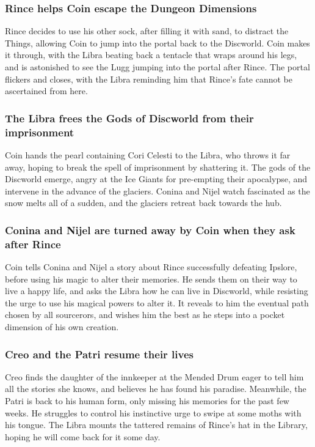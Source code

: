 \subsubsection{\Gls{Rince} helps \Gls{Coin} escape the Dungeon Dimensions}
\Gls{Rince} decides to use his other sock, after filling it with sand, to distract the Things,
allowing \Gls{Coin} to jump into the portal back to the Discworld. \Gls{Coin} makes it through,
with the \Gls{Libra} beating back a tentacle that wraps around his legs, and is astonished to see
the \Gls{Lugg} jumping into the portal after \Gls{Rince}. The portal flickers and closes, with the
\Gls{Libra} reminding him that \Gls{Rince}'s fate cannot be ascertained from here.

\subsubsection{The \Gls{Libra} frees the Gods of Discworld from their imprisonment}
\Gls{Coin} hands the pearl containing Cori Celesti to the \Gls{Libra}, who throws it far away,
hoping to break the spell of imprisonment by shattering it. The gods of the Discworld emerge, angry
at the Ice Giants for pre-empting their apocalypse, and intervene in the advance of the glaciers.
\Gls{Conina} and \Gls{Nijel} watch fascinated as the snow melts all of a sudden, and the glaciers
retreat back towards the hub.

\subsubsection{\Gls{Conina} and \Gls{Nijel} are turned away by \Gls{Coin} when they ask after
    \Gls{Rince}}
\Gls{Coin} tells \Gls{Conina} and \Gls{Nijel} a story about \Gls{Rince} successfully defeating
\Gls{Ipslore}, before using his magic to alter their memories. He sends them on their way to live a
happy life, and asks the \Gls{Libra} how he can live in Discworld, while resisting the urge to use
his magical powers to alter it. It reveals to him the eventual path chosen by all sourcerors, and
wishes him the best as he steps into a pocket dimension of his own creation.

\subsubsection{\Gls{Creo} and the \Gls{Patri} resume their lives}
\Gls{Creo} finds the daughter of the innkeeper at the Mended Drum eager to tell him all the stories
she knows, and believes he has found his paradise. Meanwhile, the \Gls{Patri} is back to his human
form, only missing his memories for the past few weeks. He struggles to control his instinctive urge
to swipe at some moths with his tongue. The \Gls{Libra} mounts the tattered remains of \Gls{Rince}'s
hat in the Library, hoping he will come back for it some day.